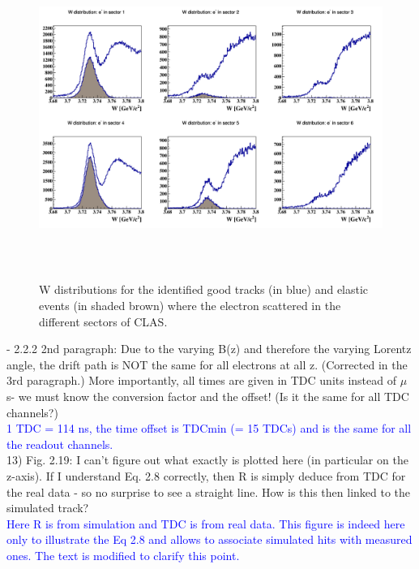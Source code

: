 \begin{figure}[!h]
   \centering
   \includegraphics[height=10.5cm]{fig/W_dis_sectors.png}
   \caption{W distributions for the identified good tracks (in blue) and 
   elastic events (in shaded brown) where the electron scattered in the 
different sectors of CLAS.}
   \label{fig:W_sec}
\end{figure}


- 2.2.2 2nd paragraph: Due to the varying B(z) and therefore the varying 
Lorentz angle, the drift path is NOT the same for all electrons at all z.  
(Corrected in the 3rd paragraph.)
More importantly, all times are given in TDC units instead of $\mu$s- we must 
know the conversion factor and the offset! (Is it the same for all TDC 
channels?)\\
\textcolor{blue}{1 TDC = 114 ns, the time offset is TDCmin (= 15 TDCs) and is 
the same for all the readout channels.}\\

13) Fig. 2.19: I can't figure out what exactly is plotted here (in particular 
on the z-axis). If I understand Eq. 2.8 correctly, then R is simply deduce from 
TDC for the real data - so no surprise to see a straight line. How is this then 
linked to the simulated track?\\
\textcolor{blue}{Here R is from simulation and TDC is from real data. This 
figure is indeed here only to illustrate the Eq 2.8 and allows to associate
simulated hits with measured ones. The text is modified to clarify this 
point.}\\


